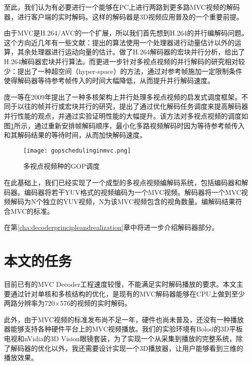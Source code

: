 至此，我们认为有必要进行一个能够在PC上进行两路到更多路MVC视频的解码器，进行客户端的实时解码。这样的解码器是3D视频应用普及的一个重要前提。

由于MVC是H.264/AVC的一个扩展，所以我们首先想到H.264的并行编解码问题。这个方向近几年有一些文献：提出的算法使用一个处理器进行动量估计以外的运算，其余处理器进行运动向量的估计。做了H.264解码器的宏块并行分析，给出了H.264解码器宏块并行算法。而更进一步针对多视点视频的并行解码的研究相对较少：提出了一种超空间（hyper-space）的方法，通过对参考帧施加一定限制条件使得解码器等待参考帧传入的时间大幅降低，从而提升并行解码速度。

庞一等在2009年提出了一种多核架构上并行处理多视点视频的启发式调度框架\cite{pang2009framework}。不同于以往的帧并行或宏块并行的研究，提出了通过优化解码任务调度来提高解码器并行性能的观点，并通过实验证明性能的大幅提升。该方法对多视点视频的调度如图\ref{fig:gopschedulinginmvc}所示，通过重新安排帧解码顺序，最小化多路视频解码时因为等待参考帧传入和其解码结果的等待时间，从而加快解码速度。
\begin{figure}[htbp]
\begin{center}
\texttt{[image: gopschedulinginmvc.png]}
\caption{多视点视频种的GOP调度}
\label{fig:gopschedulinginmvc}
\end{center}
\end{figure}


在此基础上，我们已经实现了一个成型的多视点视频编解码系统，包括编码器和解码器。编码器将若干YUV格式的视频编码为一个MVC视频。解码器将一个MVC视频解码为N个独立的YUV视频，N为该MVC视频包含的视角数量。编解码结果符合MVC的标准\cite{iso2009mvc}。

在第\ref{cha:decoderprincipleandrealization}章中将进一步介绍解码器部分。

\section{本文的任务}
\label{sec:workbrief}

目前已有的MVC Decoder工程速度较慢，不能满足实时解码播放的要求。本文主要通过针对单核和多核结构的优化，是现有的MVC解码器能够在CPU上做到至少两路分辨率为720$\times$576的视频的实时解码。

此外，由于MVC视频的标准\cite{iso2009mvc}发布尚不足一年，硬件也尚未普及，还没有一种播放器能够支持各种硬件平台上的MVC视频播放。我们的实验环境有Bolod的3D平板电视和nVidia的3D Vision眼镜套装，为了实现一个从采集到播放的完整系统，除了解码器的优化以外，我还需要设计实现一个3D播放器，让用户能够看到三维的播放效果。

